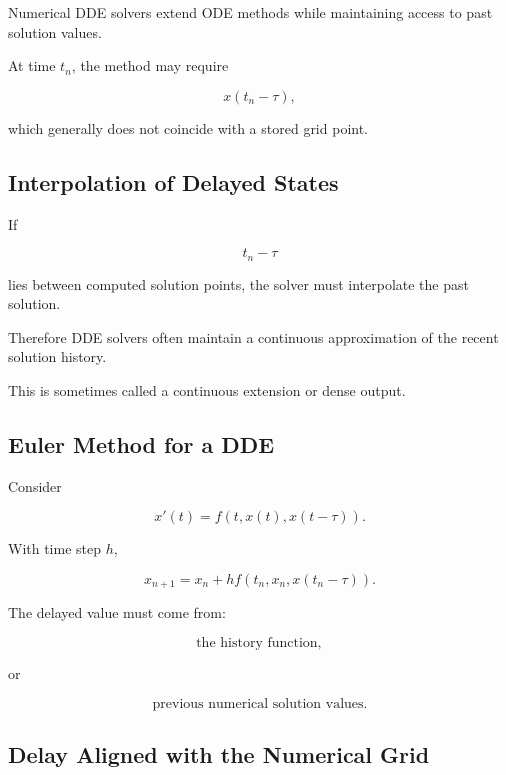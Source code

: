Numerical DDE solvers extend ODE methods while maintaining access to past
solution values.

At time \(t_n\), the method may require

\[
\boxed{
x(t_n-\tau),
}
\]

which generally does not coincide with a stored grid point.

\subsection{Interpolation of Delayed States}
\label{subsec:dde-interpolation}

If

\[
t_n-\tau
\]

lies between computed solution points, the solver must interpolate the
past solution.

Therefore DDE solvers often maintain a continuous approximation of the
recent solution history.

This is sometimes called a continuous extension or dense output.

\subsection{Euler Method for a DDE}
\label{subsec:euler-method-dde}

Consider

\[
x'(t)
=
f
\left(
t,
x(t),
x(t-\tau)
\right).
\]

With time step \(h\),

\[
\boxed{
x_{n+1}
=
x_n
+
h
f
\left(
t_n,
x_n,
x(t_n-\tau)
\right).
}
\]

The delayed value must come from:

\[
\boxed{
\text{the history function},
}
\]

or

\[
\boxed{
\text{previous numerical solution values}.
}
\]

\subsection{Delay Aligned with the Numerical Grid}
\label{subsec:dde-grid-aligned-delay}


